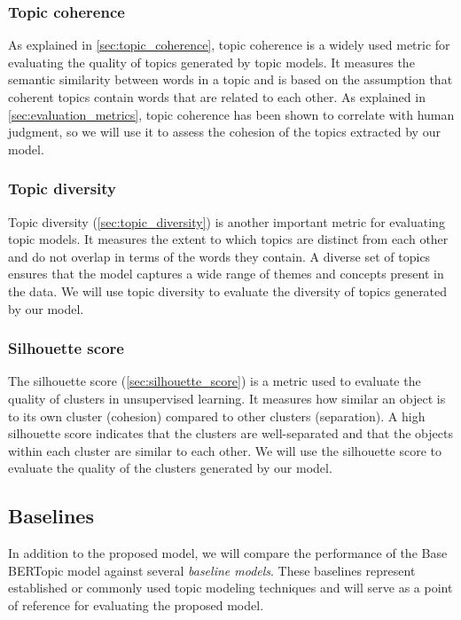 \subsubsection{Topic coherence}
As explained in \cref{sec:topic_coherence}, topic coherence is a widely used metric for evaluating the quality of topics generated by topic models. It measures the semantic similarity between words in a topic and is based on the assumption that coherent topics contain words that are related to each other. As explained in \cref{sec:evaluation_metrics}, topic coherence has been shown to correlate with human judgment, so we will use it to assess the cohesion of the topics extracted by our model.

\subsubsection{Topic diversity}
Topic diversity (\cref{sec:topic_diversity}) is another important metric for evaluating topic models. It measures the extent to which topics are distinct from each other and do not overlap in terms of the words they contain. A diverse set of topics ensures that the model captures a wide range of themes and concepts present in the data. We will use topic diversity to evaluate the diversity of topics generated by our model.

\subsubsection{Silhouette score}
The silhouette score (\cref{sec:silhouette_score}) is a metric used to evaluate the quality of clusters in unsupervised learning. It measures how similar an object is to its own cluster (cohesion) compared to other clusters (separation). A high silhouette score indicates that the clusters are well-separated and that the objects within each cluster are similar to each other. We will use the silhouette score to evaluate the quality of the clusters generated by our model.

\subsection{Baselines}
In addition to the proposed model, we will compare the performance of the Base BERTopic model against several \textit{baseline models}. These baselines represent established or commonly used topic modeling techniques and will serve as a point of reference for evaluating the proposed model. 

